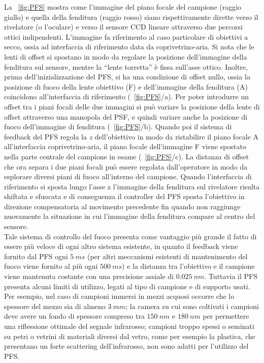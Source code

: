 \begin{itemize}
La \figurename~\ref{fig:PFS} mostra come l'immagine del piano focale del campione (raggio giallo) e quella della fenditura (raggio rosso) siano rispettivamente dirette verso il rivelatore (o l'oculare) e verso il sensore CCD lineare attraverso due percorsi ottici indipendenti.
L'immagine fa riferimento al caso particolare di obiettivi a secco, ossia ad interfaccia di riferimento data da coprivetrino-aria.
Si nota che le lenti di offset si spostano in modo da regolare la posizione dell'immagine della fenditura sul sensore, mentre la ``lente torretta'' è fissa sull'asse ottico. 
Inoltre, prima dell'inizializzazione del PFS, si ha una condizione di offset nullo, ossia la posizione di fuoco della lente obiettivo (F) e dell'immagine della fenditura (A) coincidono all'interfaccia di riferimento (\figurename~\ref{fig:PFS}/a). 
Per poter introdurre un offset tra i piani focali delle due immagini si può variare la posizione della lente di offset attraverso una manopola del PSF, e quindi variare anche la posizione di fuoco dell'immagine di fenditura (\figurename~\ref{fig:PFS}/b). 
Quando poi il sistema di feedback del PFS regola la $z$ dell'obiettivo in modo da ristabilire il piano focale A all'interfaccia coprivetrino-aria, il piano focale dell'immagine F viene spostato nella parte centrale del campione in esame (\figurename~\ref{fig:PFS}/c). 
La distanza di offset che ora separa i due piani focali può essere regolata dall'operatore in modo da esplorare diversi piani di fuoco all'interno del campione.
Quando l'interfaccia di riferimento si sposta lungo l'asse z l'immagine della fenditura sul rivelatore risulta shiftata e sfuocata e di conseguenza il controller del PFS sposta l'obiettivo in direzione compensatoria al movimento precedente fin quando non raggiunge nuovamente la situazione in cui l'immagine della fenditura compare al centro del sensore. 
\\Tale sistema di controllo del fuoco presenta come vantaggio più grande il fatto di essere più veloce di ogni altro sistema esistente, in quanto il feedback viene fornito dal PFS ogni $5\ ms$ (per altri meccanismi esistenti di mantenimento del fuoco viene fornito al più ogni $500\ ms$) e la distanza tra l'obiettivo e il campione viene mantenuta costante con una precisione assiale di $0.025\ nm$. 
Tuttavia il PFS presenta alcuni limiti di utilizzo, legati al tipo di campione e di supporto usati. 
Per esempio, nel caso di campioni immersi in mezzi acquosi occorre che lo spessore del mezzo sia di almeno $3\ mm$; la camera su cui sono coltivati i campioni deve avere un fondo di spessore compreso tra $150\ nm$ e $180\ nm$ per permettere una riflessione ottimale del segnale infrarosso; campioni troppo spessi o seminati su petri o vetrini di materiali diversi dal vetro, come per esempio la plastica, che presentano un forte scattering dell'infrarosso, non sono adatti per l'utilizzo del PFS. 

\end{itemize}
